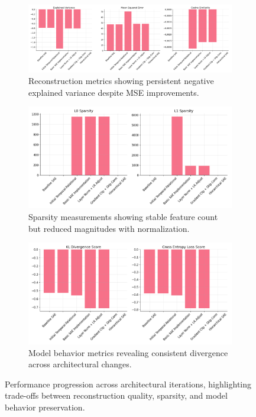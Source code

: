 \documentclass{article} %
\begin{document}
\begin{figure}[h]
    \centering
    \begin{subfigure}{0.32\textwidth}
        \includegraphics[width=\textwidth]{reconstruction_metrics.png}
        \caption{Reconstruction metrics showing persistent negative explained variance despite MSE improvements.}
        \label{fig:reconstruction}
    \end{subfigure}
    \hfill
    \begin{subfigure}{0.32\textwidth}
        \includegraphics[width=\textwidth]{sparsity_metrics.png}
        \caption{Sparsity measurements showing stable feature count but reduced magnitudes with normalization.}
        \label{fig:sparsity}
    \end{subfigure}
    \hfill
    \begin{subfigure}{0.32\textwidth}
        \includegraphics[width=\textwidth]{model_preservation.png}
        \caption{Model behavior metrics revealing consistent divergence across architectural changes.}
        \label{fig:preservation}
    \end{subfigure}
    \caption{Performance progression across architectural iterations, highlighting trade-offs between reconstruction quality, sparsity, and model behavior preservation.}
    \label{fig:metrics}
\end{figure}
\end{document}
